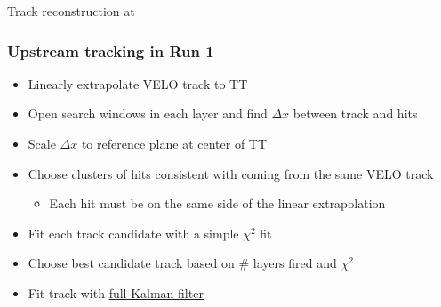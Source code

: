 \documentclass[aspectratio=1610]{beamer}
\begin{document}
\begin{frame}{Track reconstruction at \lhcb}

\end{frame}

\begin{frame}\frametitle{Upstream tracking in Run 1}
  \begin{itemize}
  \item Linearly extrapolate VELO track to TT
  \item Open search windows in each layer and find $\Delta x$ between track and hits
  \item Scale $\Delta x$ to reference plane at center of TT
  \item Choose clusters of hits consistent with coming from the same VELO track
  \begin{itemize}
    \item[\ding{72}] Each hit must be on the same side of the linear extrapolation
  \end{itemize}
  \item Fit each track candidate with a simple $\chi^{2}$ fit
  \item Choose best candidate track based on \# layers fired and $\chi^{2}$
  \item Fit track with \underline{full Kalman filter}
  \end{itemize}
  
\end{frame}
\end{document}
